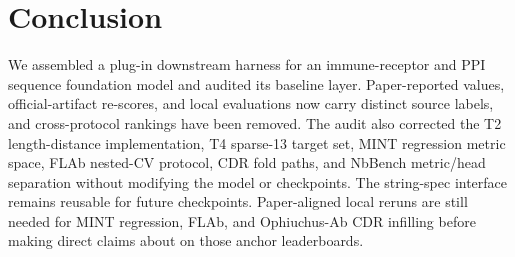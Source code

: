 \section{Conclusion}
\label{sec:conclusion}

We assembled a plug-in downstream harness for an immune-receptor and PPI
sequence foundation model and audited its baseline layer. Paper-reported values,
official-artifact re-scores, and local evaluations now carry distinct source
labels, and cross-protocol rankings have been removed. The audit also corrected
the T2 length-distance implementation, T4 sparse-13 target set, MINT regression
metric space, FLAb nested-CV protocol, CDR fold paths, and NbBench metric/head
separation without modifying the model or checkpoints. The string-spec interface
remains reusable for future checkpoints. Paper-aligned local reruns are still
needed for MINT regression, FLAb, and Ophiuchus-Ab CDR infilling before making
direct claims about \Ours{} on those anchor leaderboards.
